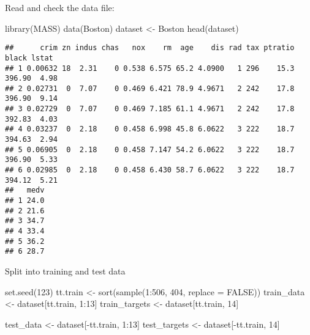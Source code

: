 \documentclass[
  10pt,
  ignorenonframetext,
]{beamer}
\newenvironment{Shaded}{\begin{snugshade}}{\end{snugshade}}
\newcommand{\AttributeTok}[1]{\textcolor[rgb]{0.77,0.63,0.00}{#1}}
\newcommand{\ConstantTok}[1]{\textcolor[rgb]{0.00,0.00,0.00}{#1}}
\newcommand{\DecValTok}[1]{\textcolor[rgb]{0.00,0.00,0.81}{#1}}
\newcommand{\FunctionTok}[1]{\textcolor[rgb]{0.00,0.00,0.00}{#1}}
\newcommand{\NormalTok}[1]{#1}
\newcommand{\OtherTok}[1]{\textcolor[rgb]{0.56,0.35,0.01}{#1}}
\newcommand{\SpecialCharTok}[1]{\textcolor[rgb]{0.00,0.00,0.00}{#1}}
\begin{document}
\begin{frame}[fragile]
Read and check the data file:

\scriptsize

\begin{Shaded}
\begin{Highlighting}[]
\FunctionTok{library}\NormalTok{(MASS)}
\FunctionTok{data}\NormalTok{(Boston)}
\NormalTok{dataset }\OtherTok{\textless{}{-}}\NormalTok{ Boston}
\FunctionTok{head}\NormalTok{(dataset)}
\end{Highlighting}
\end{Shaded}

\begin{verbatim}
##      crim zn indus chas   nox    rm  age    dis rad tax ptratio  black lstat
## 1 0.00632 18  2.31    0 0.538 6.575 65.2 4.0900   1 296    15.3 396.90  4.98
## 2 0.02731  0  7.07    0 0.469 6.421 78.9 4.9671   2 242    17.8 396.90  9.14
## 3 0.02729  0  7.07    0 0.469 7.185 61.1 4.9671   2 242    17.8 392.83  4.03
## 4 0.03237  0  2.18    0 0.458 6.998 45.8 6.0622   3 222    18.7 394.63  2.94
## 5 0.06905  0  2.18    0 0.458 7.147 54.2 6.0622   3 222    18.7 396.90  5.33
## 6 0.02985  0  2.18    0 0.458 6.430 58.7 6.0622   3 222    18.7 394.12  5.21
##   medv
## 1 24.0
## 2 21.6
## 3 34.7
## 4 33.4
## 5 36.2
## 6 28.7
\end{verbatim}

\normalsize

Split into training and test data

\scriptsize

\begin{Shaded}
\begin{Highlighting}[]
\FunctionTok{set.seed}\NormalTok{(}\DecValTok{123}\NormalTok{)}
\NormalTok{tt.train }\OtherTok{\textless{}{-}} \FunctionTok{sort}\NormalTok{(}\FunctionTok{sample}\NormalTok{(}\DecValTok{1}\SpecialCharTok{:}\DecValTok{506}\NormalTok{, }\DecValTok{404}\NormalTok{, }\AttributeTok{replace =} \ConstantTok{FALSE}\NormalTok{))}
\NormalTok{train\_data }\OtherTok{\textless{}{-}}\NormalTok{ dataset[tt.train, }\DecValTok{1}\SpecialCharTok{:}\DecValTok{13}\NormalTok{]}
\NormalTok{train\_targets }\OtherTok{\textless{}{-}}\NormalTok{ dataset[tt.train, }\DecValTok{14}\NormalTok{]}

\NormalTok{test\_data }\OtherTok{\textless{}{-}}\NormalTok{ dataset[}\SpecialCharTok{{-}}\NormalTok{tt.train, }\DecValTok{1}\SpecialCharTok{:}\DecValTok{13}\NormalTok{]}
\NormalTok{test\_targets }\OtherTok{\textless{}{-}}\NormalTok{ dataset[}\SpecialCharTok{{-}}\NormalTok{tt.train, }\DecValTok{14}\NormalTok{]}
\end{Highlighting}
\end{Shaded}
\end{frame}
\end{document}
